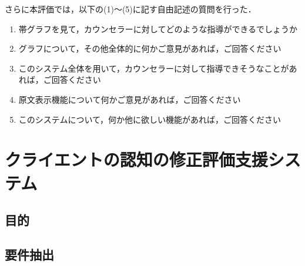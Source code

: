 \documentclass[shuuron]{kuee}
\begin{document}
さらに本評価では，以下の(1)～(5)に記す自由記述の質問を行った．



\begin{enumerate}
  \item 帯グラフを見て，カウンセラーに対してどのような指導ができるでしょうか
  \item グラフについて，その他全体的に何かご意見があれば，ご回答ください
  \item このシステム全体を用いて，カウンセラーに対して指導できそうなことがあれば，ご回答ください
  \item 原文表示機能について何かご意見があれば，ご回答ください
  \item このシステムについて，何か他に欲しい機能があれば，ご回答ください
\end{enumerate}









\chapter{クライエントの認知の修正評価支援システム}
\section{目的}


\section{要件抽出}

%
\end{document}
